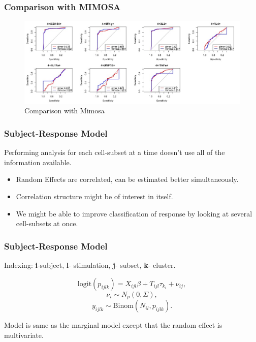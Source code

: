 \documentclass{beamer}
\theoremstyle{definition}
\begin{document}

\begin{frame}
\frametitle{Comparison with MIMOSA}
\begin{figure}[]
\includegraphics[width=12 cm]{figures/mimosaComparison} \caption{Comparison with Mimosa}
\end{figure}
\end{frame}


\begin{frame}
\frametitle{Subject-Response Model}
Performing analysis for each cell-subset at a time doesn't use all of the information available.
\pause
\vspace{0.3 cm} 
\begin{itemize}
\item Random Effects are correlated, can be estimated better simultaneously.
\vspace{0.3 cm}
\item Correlation structure might be of interest in itself. 
\vspace{0.3 cm}
\item We might be able to improve classification of response by looking at several cell-subsets at once.  
\end{itemize}
\end{frame}


\begin{frame}
\frametitle{Subject-Response Model}
\begin{framed}
Indexing: \textbf{i}-subject, \textbf{l}- stimulation, \textbf{j}- subset, \textbf{k}- cluster.
\end{framed}

$$
\text{logit}(p_{ijlk}) = X_{ijl} \beta + T_{ijl}\tau_{k_i} + \nu_{ij},
$$$$
\nu_{i} \sim N_{p}(0, \Sigma),
$$$$
y_{ijlk} \sim \text{Binom}(N_{il}, p_{ijlk}).
$$

\pause
Model is same as the marginal model except that the random effect is multivariate. 
\end{frame}
\end{document}
